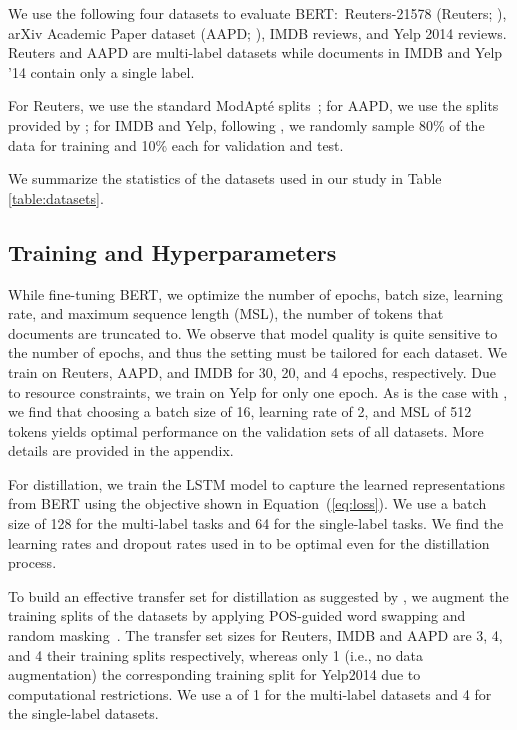 \documentclass[11pt,a4paper]{article}
\newcommand{\BLSTMR}[1]{LSTM}
\newcommand{\BERTL}[1]{BERT}
\begin{document}
We use the following four datasets to evaluate BERT:\ Reuters-21578 (Reuters; \citealp{apte1994automated}), arXiv Academic Paper dataset (AAPD; \citealp{yang2018sgm}), IMDB reviews, and Yelp 2014 reviews.
Reuters and AAPD are multi-label datasets while documents in IMDB and Yelp '14 contain only a single label.

For Reuters, we use the standard ModApt\'{e} splits~\cite{apte1994automated}; for AAPD, we use the splits provided by \citet{yang2018sgm}; for IMDB and Yelp, following \citet{yang2016hierarchical}, we randomly sample 80\% of the data for training and 10\%  each for validation and test.

We summarize the statistics of the datasets used in our study in Table \ref{table:datasets}.

\subsection{Training and Hyperparameters}

While fine-tuning BERT, we optimize the number of epochs, batch size, learning rate, and maximum sequence length (MSL), the number of tokens that documents are truncated to.
We observe that model quality is quite sensitive to the number of epochs, and thus the setting must be tailored for each dataset.
We train on Reuters, AAPD, and IMDB for 30, 20, and 4 epochs, respectively.
Due to resource constraints, we train on Yelp for only one epoch.
As is the case with \citet{devlin2018bert}, we find that choosing a batch size of 16, learning rate of 2, and MSL of 512 tokens yields optimal performance on the validation sets of all datasets.
More details are provided in the appendix.

For distillation, we train the \BLSTMR{} model to capture the learned representations from \BERTL{} using the objective shown in Equation~(\ref{eq:loss}).
We use a batch size of 128 for the multi-label tasks and 64 for the single-label tasks.
We find the learning rates and dropout rates used in \citet{adhikari2019rethinking} to be optimal even for the distillation process.

To build an effective transfer set for distillation as suggested by \citet{hintonkd}, we augment the training splits of the datasets by applying POS-guided word swapping and random masking~\cite{ralphdistill}.
The transfer set sizes for Reuters, IMDB and AAPD are 3, 4, and 4 their training splits respectively, whereas only 1 (i.e., no data augmentation) the corresponding training split for Yelp2014 due to computational restrictions.
We use a  of 1 for the multi-label datasets and 4 for the single-label datasets.
\end{document}
